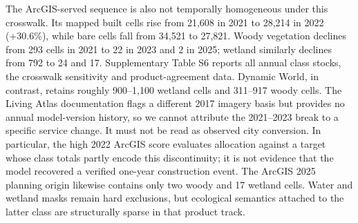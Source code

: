 The ArcGIS-served sequence is also not temporally homogeneous under this
crosswalk. Its mapped built cells rise from 21,608 in 2021 to 28,214 in
2022 (+30.6\%), while bare cells fall from 34,521 to 27,821. Woody
vegetation declines from 293 cells in 2021 to 22 in 2023 and 2 in 2025;
wetland similarly declines from 792 to 24 and 17. Supplementary Table S6
reports all annual class stocks, the crosswalk sensitivity and
product-agreement data. Dynamic World, in contrast, retains roughly
900--1,100 wetland cells and 311--917 woody cells. The Living Atlas
documentation flags a different 2017 imagery basis but provides no
annual model-version history, so we cannot attribute the 2021--2023
break to a specific service change. It must not be read as observed city
conversion. In particular, the high 2022 ArcGIS score evaluates
allocation against a target whose class totals partly encode this
discontinuity; it is not evidence that the model recovered a verified
one-year construction event. The ArcGIS 2025 planning origin likewise
contains only two woody and 17 wetland cells. Water and wetland masks
remain hard exclusions, but ecological semantics attached to the latter
class are structurally sparse in that product track.

